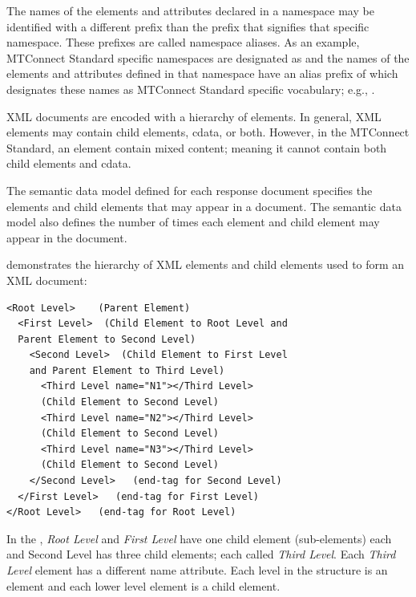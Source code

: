 \documentclass{mtconnect}	%
\begin{document}
\begin{itemize}
The names of the elements and attributes declared in a \gls{namespace} may be identified with a different prefix than the prefix that signifies that specific \gls{namespace}.  These prefixes are called \gls{namespace} aliases.  As an example, MTConnect Standard specific \glspl{namespace} are designated as  and the names of the elements and attributes defined in that \gls{namespace} have an alias prefix of  which designates these names as MTConnect Standard specific vocabulary; e.g., . 
\end{itemize}

XML documents are encoded with a hierarchy of elements.  In general, XML elements may contain \glspl{child element}, \gls{cdata}, or both.  However, in the MTConnect Standard, an element \MUSTNOT contain mixed content; meaning it cannot contain both \glspl{child element} and \gls{cdata}. 

The \gls{semantic data model} defined for each \gls{response document} specifies the elements and \glspl{child element} that may appear in a document.  The \gls{semantic data model} also defines the number of times each element and \gls{child element} may appear in the document.

 demonstrates the hierarchy of XML elements and \glspl{child element} used to form an XML document:

\begin{lstlisting}[firstnumber=1,escapechar=|,%
    caption={Example of hierarchy of XML elements}, label={lst:hierarchy-of-xml-elements}]
<Root Level>    (Parent Element)
  <First Level>  (Child Element to Root Level and 
  Parent Element to Second Level)
    <Second Level>  (Child Element to First Level
    and Parent Element to Third Level)
      <Third Level name="N1"></Third Level>  
      (Child Element to Second Level)
      <Third Level name="N2"></Third Level>  
      (Child Element to Second Level)
      <Third Level name="N3"></Third Level>  
      (Child Element to Second Level)
    </Second Level>   (end-tag for Second Level)
  </First Level>   (end-tag for First Level)
</Root Level>   (end-tag for Root Level)
\end{lstlisting}


In the , \textit{Root Level} and \textit{First Level} have one \gls{child element} (sub-elements) each and Second Level has three \glspl{child element}; each called \textit{Third Level}.  Each \textit{Third Level} element has a different name attribute.  Each level in the structure is an element and each lower level element is a \gls{child element}.
\end{document}
